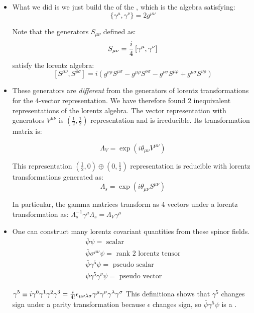 \documentclass[11pt]{scrartcl}
\begin{document}
\begin{itemize}
\item What we did is we just build the  of the , which is the algebra satisfying:
\[  \{ \gamma^\mu, \gamma^\nu \} = 2 g^{\mu \nu} \]

Note that the generators $S_{\mu \nu}$ defined as:
\[ S_{\mu \nu} = {i \over 4} \left[\gamma^\mu, \gamma^\nu \right] \]
satisfy the lorentz algebra:
\[ [S^{\mu \nu}, S^{\rho \sigma}]  = i \left(g^{\nu \rho} S^{\mu \sigma} 
- g^{\mu \rho} S^{\nu \sigma} 
- g^{\nu \sigma} S^{\mu \rho}
+ g^{\mu \sigma} S^{\nu \rho}\right) \]

\item These generators are \emph{different} from the generators of lorentz transformations for the 4-vector representation.  We have therefore found 2 inequivalent representations of the lorentz algebra.  The vector representation with generators $V^{\mu \nu}$ is $(\frac12, \frac12) $ representation and is irreducible. Its transformation matrix is:

\[ \Lambda_V = \exp(i \theta_{\mu \nu} V^{\mu \nu})\]

 This  representation $(\frac12, 0) \oplus (0, \frac12)$ representation is reducible with lorentz transformations generated as:
\[ \Lambda_s = \exp(i \theta_{\mu \nu} S^{\mu \nu})\]

In particular, the gamma matrices transform as 4 vectors under a lorentz transformation as:
$\Lambda_s^{-1} \gamma^\mu \Lambda_s = \Lambda_V \gamma^\mu$

\item  One can construct many lorentz covariant quantities from these spinor fields.
\begin{align}
	\bar{\psi} \psi = \text{ scalar} \\
	\bar{\psi} \sigma^{\mu \nu} \psi = \text{ rank 2 lorentz tensor} \\
	\bar{\psi} \gamma^5 \psi = \text{ pseudo scalar } \\
	\bar{\psi} \gamma^5 \gamma^\nu \psi = \text{  pseudo vector } 
	\end{align}

$\gamma^5 \equiv i \gamma^0 \gamma^1 \gamma^2 \gamma^3 = {i \over 4!} \epsilon_{\mu \nu \lambda \sigma} \gamma^{\mu} \gamma^{\nu} \gamma^{\lambda} \gamma^{\sigma}$
This definitiona shows that $\gamma^5$ changes sign under a parity transformation because $\epsilon$ changes sign, so $\bar{\psi} \gamma^5 \psi$ is a .
	\end{itemize}
\end{document}

